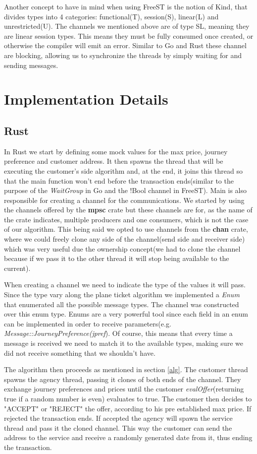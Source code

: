 \documentclass[runningheads]{llncs}
\begin{document}
Another concept to have in mind when using FreeST is the notion of Kind, that divides types into 4 categories:
functional(T), session(S), linear(L) and unrestricted(U).
The channels we mentioned above are of type SL, meaning they are linear session types. This means they must be fully consumed once created, or otherwise the compiler will emit an error.
Similar to Go and Rust these channel are blocking, allowing us to synchronize the threads by simply waiting for and sending messages.
\section{Implementation Details}
\subsection{Rust}
In Rust we start by defining some mock values for the max price, journey preference and customer address. It then spawns the thread that will be executing the customer's side algorithm and, at the end, it joins this thread so that the main function won't end before the transaction ends(similar to the purpose of the {\it WaitGroup} in Go and the !Bool channel in FreeST). Main is also responsible for creating a channel for the communications. We started by using the channels offered by the {\bf mpsc} crate but these channels are for, as the name of the crate indicates, multiple producers and one consumers, which is not the case of our algorithm. This being said we opted to use channels from the {\bf chan} crate, where we could freely clone any side of the channel(send side and receiver side) which was very useful due the ownership concept(we had to clone the channel because if we pass it to the other thread it will stop being available to the current).

When creating a channel we need to indicate the type of the values it will pass. Since the type vary along the plane ticket algorithm we implemented a {\it Enum} that enumerated all the possible message types. The channel was constructed over this enum type. Enums are a very powerful tool since each field in an enum can be implemented in order to receive parameters(e.g. {\it Message::JourneyPreference(jpref}). Of course, this means  that every time a message is received we need to match it to the available types, making sure we did not receive something that we shouldn't have.

The algorithm then proceeds as mentioned in section \ref{alg}. The customer thread spawns the agency thread, passing it clones of both ends of the channel. They exchange journey preferences and prices until the customer {\it evalOffer}(returning true if a random number is even) evaluates to true. The customer then decides to "ACCEPT" or "REJECT" the offer, according to his pre established max price. If rejected the transaction ends. If accepted the agency will spawn the service thread and pass it the cloned channel. This way the customer can send the address to the service and receive a randomly generated date from it, thus ending the transaction.
\end{document}
